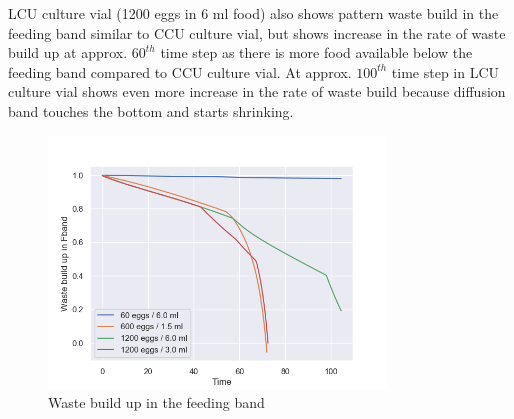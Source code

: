 LCU culture vial (1200 eggs in 6 ml food) also shows pattern waste build in the feeding band similar to CCU culture vial, but shows increase in the rate of waste build up at approx. $60^{th}$ time step as there is more food available below the feeding band compared to CCU culture vial. At approx. $100^{th}$ time step in LCU culture vial shows even more increase in the rate of waste build because diffusion band touches the bottom and starts shrinking.
\begin{figure}[h]
  \centering
  \includegraphics[width=0.8\textwidth]{C2/Figs/fQ}
  \caption{Waste build up in the feeding band}
  \label{fig:fq}
\end{figure}

\pagebreak
